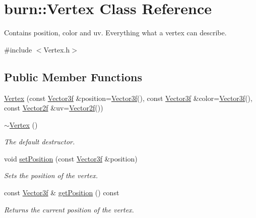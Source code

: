 \hypertarget{classburn_1_1_vertex}{\section{burn\-:\-:Vertex Class Reference}
\label{classburn_1_1_vertex}
}


Contains position, color and uv. Everything what a vertex can describe.  




{\ttfamily \#include $<$Vertex.\-h$>$}

\subsection*{Public Member Functions}
\begin{DoxyCompactItemize}
\item 
\hyperlink{classburn_1_1_vertex_ae8eacfebc5e61f6660f875fb6eefdb03}{Vertex} (const \hyperlink{namespaceburn_a9d6d349c94bc4dc9699427216128a0ef}{Vector3f} \&position=\hyperlink{namespaceburn_a9d6d349c94bc4dc9699427216128a0ef}{Vector3f}(), const \hyperlink{namespaceburn_a9d6d349c94bc4dc9699427216128a0ef}{Vector3f} \&color=\hyperlink{namespaceburn_a9d6d349c94bc4dc9699427216128a0ef}{Vector3f}(), const \hyperlink{namespaceburn_a2af71ec5609a2f2d501827804e86a9b8}{Vector2f} \&uv=\hyperlink{namespaceburn_a2af71ec5609a2f2d501827804e86a9b8}{Vector2f}())
\item 
\hyperlink{classburn_1_1_vertex_ad950d9459711c1ba4223de35623f75b6}{$\sim$\-Vertex} ()
\begin{DoxyCompactList}\small\item\em The default destructor. \end{DoxyCompactList}\item 
void \hyperlink{classburn_1_1_vertex_aa38bae183bbe857f9fabeb8e5510e9a0}{set\-Position} (const \hyperlink{namespaceburn_a9d6d349c94bc4dc9699427216128a0ef}{Vector3f} \&position)
\begin{DoxyCompactList}\small\item\em Sets the position of the vertex. \end{DoxyCompactList}\item 
const \hyperlink{namespaceburn_a9d6d349c94bc4dc9699427216128a0ef}{Vector3f} \& \hyperlink{classburn_1_1_vertex_afdc13277da83f244302ddfc1b6863444}{get\-Position} () const 
\begin{DoxyCompactList}\small\item\em Returns the current position of the vertex. \end{DoxyCompactList}\item 

\end{DoxyCompactItemize}
